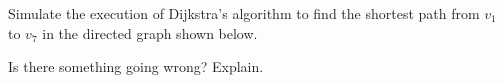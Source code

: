 Simulate the execution of Dijkstra's algorithm to find the shortest
path from $v_1$ to $v_7$ in the directed graph shown below.


\vspace{4mm}
\par
\begin{figure}[h]
\centerline{}\end{figure}

\par
\vspace{4mm}

Is there something going wrong?  Explain.  


